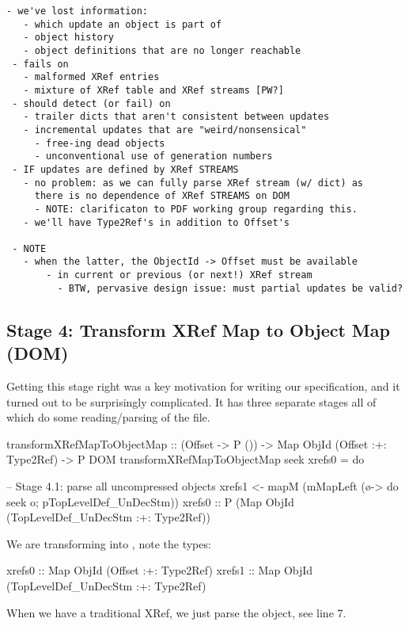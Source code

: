 \begin{lstlisting}[style=meta]
 - we've lost information:
   - which update an object is part of
   - object history
   - object definitions that are no longer reachable
 - fails on
   - malformed XRef entries
   - mixture of XRef table and XRef streams [PW?]
 - should detect (or fail) on
   - trailer dicts that aren't consistent between updates
   - incremental updates that are "weird/nonsensical"
     - free-ing dead objects
     - unconventional use of generation numbers
 - IF updates are defined by XRef STREAMS
   - no problem: as we can fully parse XRef stream (w/ dict) as
     there is no dependence of XRef STREAMS on DOM
     - NOTE: clarificaton to PDF working group regarding this.
   - we'll have Type2Ref's in addition to Offset's
      
 - NOTE 
   - when the latter, the ObjectId -> Offset must be available
       - in current or previous (or next!) XRef stream
         - BTW, pervasive design issue: must partial updates be valid?
\end{lstlisting}


\subsection{Stage 4: Transform XRef Map to Object Map (DOM)}

Getting this stage right was a key motivation for writing our
specification, and it turned out to be surprisingly complicated.  It has
three separate stages all of which do some reading/parsing of the file.

\begin{code}
transformXRefMapToObjectMap
  :: (Offset -> P ()) -> Map ObjId (Offset :+: Type2Ref) -> P DOM
transformXRefMapToObjectMap seek xrefs0 = do

    -- Stage 4.1: parse all uncompressed objects
    xrefs1 <- mapM
                (mMapLeft (\o-> do {seek o; pTopLevelDef_UnDecStm}))
                xrefs0
              :: P (Map ObjId (TopLevelDef_UnDecStm :+: Type2Ref))
\end{code}

We are transforming  into , note the types:
\begin{codeNoExecute}
  xrefs0 :: Map ObjId (Offset               :+: Type2Ref) 
  xrefs1 :: Map ObjId (TopLevelDef_UnDecStm :+: Type2Ref)
\end{codeNoExecute}
When we have a traditional XRef, we just parse the object, see line 7.

